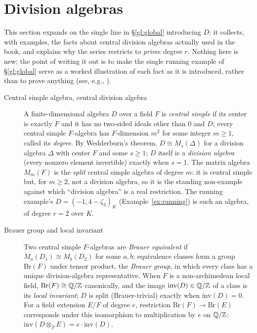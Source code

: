 \section{Division algebras}\label{gl:divalg}
This section expands on the single line in \S\ref{gl:global}
introducing $D$: it collects, with examples, the facts about central
division algebras actually used in the book, and explains why the
series restricts to \emph{prime} degree $r$. Nothing here is new; the
point of writing it out is to make the single running example of
\S\ref{gl:global} serve as a worked illustration of each fact as it
is introduced, rather than to prove anything (see, e.g., \cite{Rei75,Pie82}).
\begin{description}
\item[Central simple algebra, central division algebra] A
finite-dimensional algebra $D$ over a field $F$ is \emph{central
simple} if its center is exactly $F$ and it has no two-sided ideals
other than $0$ and $D$; every central simple $F$-algebra has
$F$-dimension $m^2$ for some integer $m\ge1$, called its
\emph{degree}. By Wedderburn's theorem, $D\cong M_s(\Delta)$ for a
division algebra $\Delta$ with center $F$ and some $s\ge1$; $D$
itself is a \emph{division algebra} (every nonzero element
invertible) exactly when $s=1$. The matrix algebra $M_m(F)$ is the
\emph{split} central simple algebra of degree $m$: it is central
simple but, for $m\ge2$, not a division algebra, so it is the
standing non-example against which ``division algebra'' is a real
restriction. The running example's $D=(-1,4-\zeta_3)_K$ (Example~\ref{ex:running}) is such an algebra, of degree $r=2$ over $K$.
\item[Brauer group and local invariant] Two central simple $F$-algebras are
\emph{Brauer equivalent} if $M_a(D_1)\cong M_b(D_2)$ for some $a,b$;
equivalence classes form a group $\mathrm{Br}(F)$ under tensor
product, the \emph{Brauer group}, in which every class has a unique
division-algebra representative. When $F$ is a non-archimedean local
field, $\mathrm{Br}(F)\cong\mathbb{Q}/\mathbb Z$ canonically, and the image
$\mathrm{inv}(D)\in\mathbb{Q}/\mathbb Z$ of a class is its \emph{local invariant};
$D$ is split (Brauer-trivial) exactly when $\mathrm{inv}(D)=0$. For a
field extension $E/F$ of degree $e$, restriction
$\mathrm{Br}(F)\to\mathrm{Br}(E)$ corresponds under this isomorphism
to multiplication by $e$ on $\mathbb{Q}/\mathbb Z$: $\mathrm{inv}(D\otimes_FE)=e\cdot\mathrm{inv}(D)$.

\end{description}
